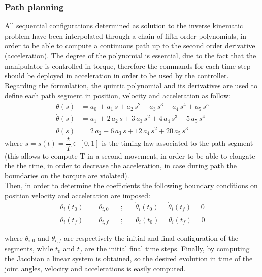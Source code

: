 \documentclass[main.tex]{subfiles}
\begin{document}
\subsubsection{Path planning}
All sequential configurations determined as solution to the inverse kinematic problem have been interpolated through a chain of fifth order polynomials, in order to be able to compute a continuous path up to the second order derivative (acceleration). The degree of the polynomial is essential, due to the fact that the manipulator is controlled in torque, therefore the commands for each time-step should be deployed in acceleration in order to be used by the controller. \\

Regarding the formulation, the quintic polynomial and its derivatives are used to define each path segment in position, velocity and acceleration as follow:
\begin{align*}
\theta(s)&=a_0\,+a_1\,s+a_2\,s^2+a_3\,s^3+a_4\,s^4+a_5\,s^5\\
\dot\theta(s)&=a_1\,+2\,a_2\,s+3\,a_3\,s^2+4\,a_4\,s^3+5\,a_5\,s^4\\
\ddot\theta(s)&=2\,a_2+6\,a_3\,s+12\,a_4\,s^2+20\,a_5\,s^3
\end{align*}
where $s=s(t)=\dfrac{t}{T}\in{[0,1]}$ is the timing law associated to the path segment (this allows to compute T in a second movement, in order to be able to elongate the the time, in order to decrease the acceleration, in case 
 during path the boundaries on the torqure are violated). \\
Then, in order to determine the coefficients the following boundary conditions on position velocity and acceleration are imposed:
\begin{align*}
\theta_i(t_0)&=\theta_{i,0} \;\;\;\;\;\; ; \;\;\;\;\;\ \dot{\theta}_i(t_0)=\dot{\theta}_i(t_f)=0 \\
\theta_i(t_f)&=\theta_{i,f}  \;\;\;\;\;\; ; \;\;\;\;\;\; \ddot{\theta}_i(t_0)=\ddot{\theta}_i(t_f)=0 
\end{align*}

where $\theta_{i,0}$ and $\theta_{i,f}$ are respectively the initial and final configuration of the segments, while $t_0$ and $t_f$ are the initial final time steps.
Finally, by computing the Jacobian a linear system is obtained, so the desired evolution in time of the joint angles, velocity and accelerations is easily computed.\\
\end{document}
